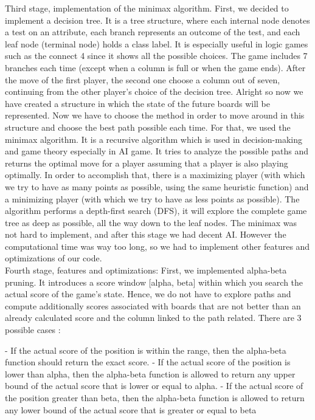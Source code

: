 \documentclass[12pt, a4paper, oneside]{report}
\begin{document}
Third stage, implementation of the minimax algorithm.
	First, we decided to implement a decision tree. It is a tree structure, where each internal node denotes a test on an attribute, each branch represents an outcome of the test, and each leaf node (terminal node) holds a class label. It is especially useful in logic games such as the connect 4 since it shows all the possible choices. The game includes 7 branches each time (except when a column is full or when the game ends). After the move of the first player, the second one choose a column out of seven, continuing from the other player’s choice of the decision tree.
	Alright so now we have created a structure in which the state of the future boards will be represented. Now we have to choose the method in order to move around in this structure and choose the best path possible each time. For that, we used the minimax algorithm. It is a recursive algorithm which is used in decision-making and game theory especially in AI game. It tries to analyze the possible paths and returns the optimal move for a player assuming that a player is also playing optimally. In order to accomplish that, there is a maximizing player (with which we try to have as many points as possible, using the same heuristic function) and a minimizing player (with which we try to have as less points as possible). The algorithm performs a depth-first search (DFS), it will explore the complete game tree as deep as possible, all the way down to the leaf nodes.
The minimax was not hard to implement, and after this stage we had  decent AI. However the computational time was way too long, so we had to implement other features and optimizations of our code. \\


Fourth stage, features and optimizations:
	First, we implemented alpha-beta pruning. It introduces a score window [alpha, beta] within which you search the actual score of the game’s state. Hence, we do not have to explore paths and compute  additionally scores associated with boards that are not better than an already calculated score and the column linked to the path related. There are 3 possible cases :  
	

- If the actual score of the position is within the range, then the alpha-beta function should return the exact score.
- If the actual score of the position is lower than alpha, then the alpha-beta function is allowed to return any upper bound of the actual score that is lower or equal to alpha.
- If the actual score of the position greater than beta, then the alpha-beta function is allowed to return any lower bound of the actual score that is greater or equal to beta
\end{document}
